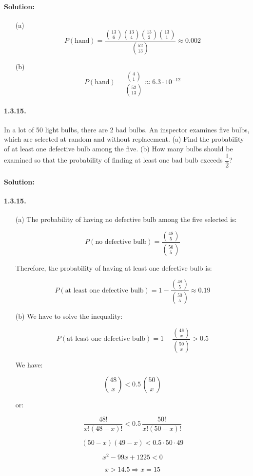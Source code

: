 \documentclass[12pt,a4paper]{article}
\begin{document}
\paragraph{Solution:} 
\begin{itemize}
	\item[(a)] 
	\[
		P(\textrm{hand}) = \frac{{13 \choose 6}{13 \choose 4}{13 \choose 2}{13 \choose 1}}{{52 \choose 13}} \approx 0.002
	\]	
	
	\item[(b)]
	\[
		P(\textrm{hand}) = \frac{{4 \choose 1}}{{52 \choose 13}} \approx 6.3\cdot 10^{-12}
	\]
\end{itemize}

\paragraph{1.3.15.} In a lot of 50 light bulbs, there are 2 bad bulbs. An inspector examines five bulbs, which are selected at random and without replacement.
(a) Find the probability of at least one defective bulb among the five.
(b) How many bulbs should be examined so that the probability of finding at least
one bad bulb exceeds $\dfrac{1}{2}$?

\paragraph{Solution:}
\paragraph{1.3.15.}

\begin{itemize}
	\item[(a)] The probability of having no defective bulb among the five selected is:

	\[
		P(\textrm{no defective bulb}) = \frac{{48 \choose 5}}{{50 \choose 5}}
	\]

Therefore, the probability of having at least one defective bulb is:

	\[
		P(\textrm{at least one defective bulb}) = 1 - \frac{{48 \choose 5}}{{50 \choose 5}} \approx 0.19
	\]
	
	\item[(b)] We have to solve the inequality:
	
	\[
		P(\textrm{at least one defective bulb}) = 1 - \frac{{48 \choose x}}{{50 \choose x}} > 0.5
	\]
	
	We have:
	
	\[
		{48 \choose x} < 0.5 \, {50 \choose x}
	\]
	
	or:
	
	\[
		\frac{48!}{x!(48-x)!} < 0.5\, \frac{50!}{x!(50-x)!}
	\]
	
	\[
		(50-x)(49-x) < 0.5\cdot 50\cdot 49
	\]
	
	\[
		x^{2} - 99x + 1225 < 0
	\]
	
	\[
		x > 14.5 \Rightarrow x = 15		
	\]
\end{itemize}
\end{document}
